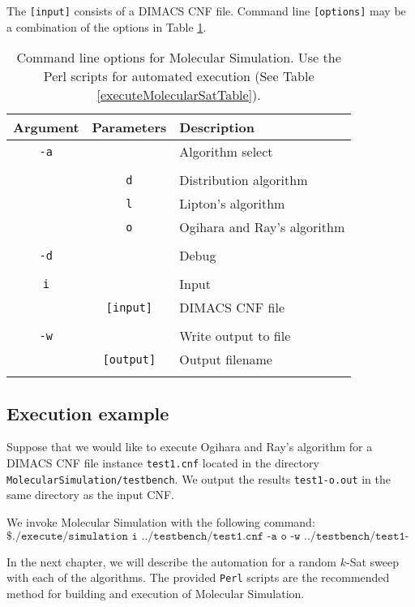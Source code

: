 The \texttt{[input]} consists of a DIMACS CNF file.  Command line \texttt{[options]} may be a combination of the options in Table \ref{MolecularCommandLineArgs}.

\begin{table}[htdp]
\caption{Command line options for Molecular Simulation.  Use the Perl scripts for automated execution (See Table \ref{executeMolecularSatTable}). }
\begin{center}
\begin{tabular}{|c|c|l|}
\hline
\textbf{Argument} & \textbf{Parameters} & \textbf{Description} \\ \hline
 \texttt{-a}	& 				   & Algorithm select \\
  				&				   &		 \\
 				& \texttt{d}	   & Distribution algorithm		 \\
 				& \texttt{l}	   & Lipton's algorithm		 \\
 				& \texttt{o}	   & Ogihara and Ray's algorithm		 \\
 				&				   &		 \\ \hline 				
\texttt{-d}		&				   & Debug		 \\ 				
 				&				   &		 \\ \hline
\texttt{i}		&				   & Input		 \\ 				
				& \texttt{[input]} & DIMACS CNF file		 \\ 				
 				&				   &		 \\ \hline 				
\texttt{-w}		&				   & Write output to file		 \\
 				& \texttt{[output]} & Output filename \\
 				&				   &		 \\ \hline 				
\end{tabular}
\end{center}
\label{MolecularCommandLineArgs}
\end{table}%

\FloatBarrier

\subsection{Execution example}

Suppose that we would like to execute Ogihara and Ray's algorithm for a DIMACS CNF file instance \texttt{test1.cnf} located in the directory \texttt{MolecularSimulation/testbench}.  We output the results \texttt{test1-o.out} in the same directory as the input CNF.

We invoke Molecular Simulation with the following command:
\[
\texttt{\$ ./execute/simulation i ../testbench/test1.cnf -a o -w ../testbench/test1-o.out}
\]
		
In the next chapter, we will describe the automation for a random $k$-{\sc Sat} sweep with each of the algorithms.  The provided \texttt{Perl} scripts are the recommended method for building and execution of Molecular Simulation.
